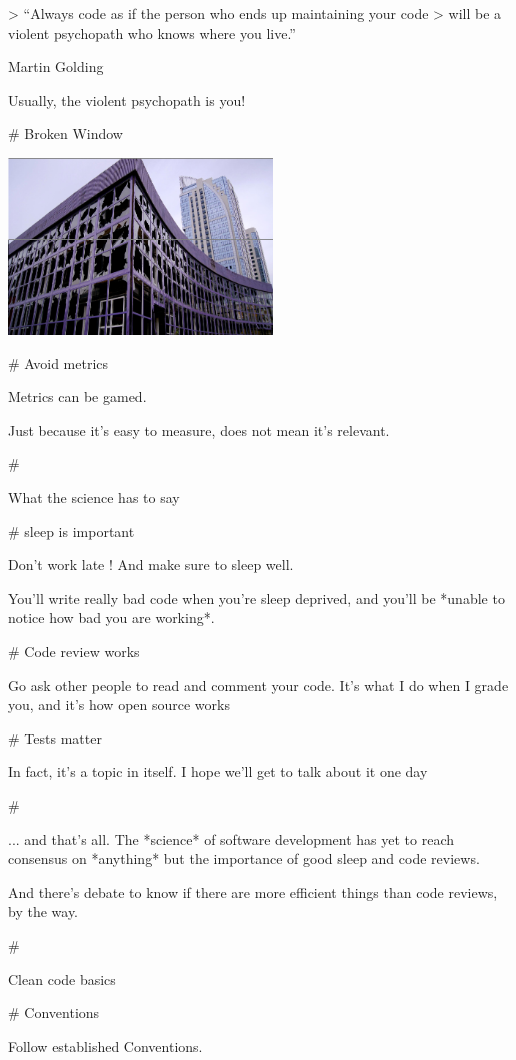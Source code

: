 > “Always code as if the person who ends up maintaining your code
> will be a violent psychopath who knows where you live.”

Martin Golding

Usually, the violent psychopath is you!

# Broken Window

\includegraphics[width=7cm]{broken-windows.png}

# Avoid metrics

Metrics can be gamed.

Just because it's easy to measure, does not mean it's relevant.

#

\huge \center What the science has to say


# sleep is important

Don't work late ! And make sure to sleep well.

\vfill

You'll write really bad code when you're sleep deprived, and you'll be
*unable to notice how bad you are working*.

# Code review works

Go ask other people to read and comment your code. It's what I do when I
grade you, and it's how open source works

# Tests matter

In fact, it's a topic in itself. I hope we'll get to talk about it one day

#

... and that's all. The *science* of software development has yet to reach
consensus on *anything* but the importance of good sleep and code reviews.

And there's debate to know if there are more efficient things than code
reviews, by the way.


#

\huge \center Clean code basics

# Conventions

Follow established Conventions.

